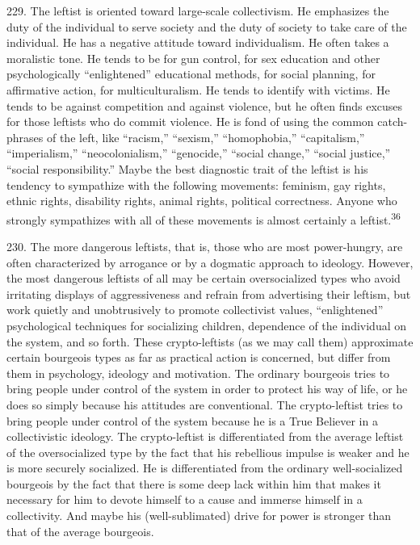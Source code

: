\documentclass{article}
\begin{document}
229.  The  leftist  is  oriented  toward  large-scale  collectivism.   He  emphasizes  the  duty  of  the 
individual to serve society and the duty of society to take care of the individual.  He has a negative 
attitude toward individualism.  He often takes a moralistic tone.  He tends to be for gun control, 
for  sex  education  and  other  psychologically  “enlightened”  educational  methods,  for  social  
planning, for affirmative action, for multiculturalism.  He tends to identify with victims.  He tends 
to be against competition and against violence, but he often finds excuses for those leftists who do 
commit  violence.   He  is  fond  of  using  the  common  catch-phrases  of  the  left,  like  “racism,”  
“sexism,”  “homophobia,”  “capitalism,”  “imperialism,”  “neocolonialism,”  “genocide,”  “social  
change,” “social justice,” “social responsibility.” Maybe the best diagnostic trait of the leftist is 
his  tendency  to  sympathize  with  the  following  movements:  feminism,  gay  rights,  ethnic  rights,  
disability rights, animal rights, political correctness.  Anyone who strongly sympathizes with all 
of these movements is almost certainly a leftist.\textsuperscript{36} \vspace{\baselineskip}

230.  The more dangerous leftists, that is, those who are most power-hungry, are often 
characterized by arrogance or by a dogmatic approach to ideology.  However, the most dangerous 
leftists of all may be certain oversocialized types who avoid irritating displays of aggressiveness 
and  refrain  from  advertising  their  leftism,  but  work  quietly  and  unobtrusively  to  promote  
collectivist  values,  “enlightened”  psychological  techniques  for  socializing  children,  dependence  
of  the  individual  on  the  system,  and  so  forth.   These  crypto-leftists  (as  we  may  call  them)  
approximate certain bourgeois types as far as practical action is concerned, but differ from them 
in  psychology,  ideology  and  motivation.   The  ordinary  bourgeois  tries  to  bring  people  under  
control of the system in order to protect his way of life, or he does so simply because his attitudes 
are conventional.  The crypto-leftist tries to bring people under control of the system because he 
is a True Believer in a collectivistic ideology.  The crypto-leftist is differentiated from the average 
leftist of the oversocialized type by the fact that his rebellious impulse is weaker and he is more 
securely socialized.  He is differentiated from the ordinary well-socialized bourgeois by the fact 
that there is some deep lack within him that makes it necessary for him to devote himself to a cause 
and  immerse  himself  in  a  collectivity.   And  maybe  his  (well-sublimated)  drive  for  power  is  
stronger than that of the average bourgeois. 
\end{document}
